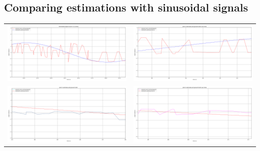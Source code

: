 \subsection{Comparing estimations with sinusoidal signals} \label{4_1_sinus_plots}
\begin{tabular}{c c}
    \includegraphics[width=0.5\linewidth]{plots/joint1_q4.png} &
    \includegraphics[width=0.5\linewidth]{plots/joint2_q4.png} \\
    \includegraphics[width=0.5\linewidth]{plots/joint3_q4.png} &
    \includegraphics[width=0.5\linewidth]{plots/joint4_q4.png}
\end{tabular}

